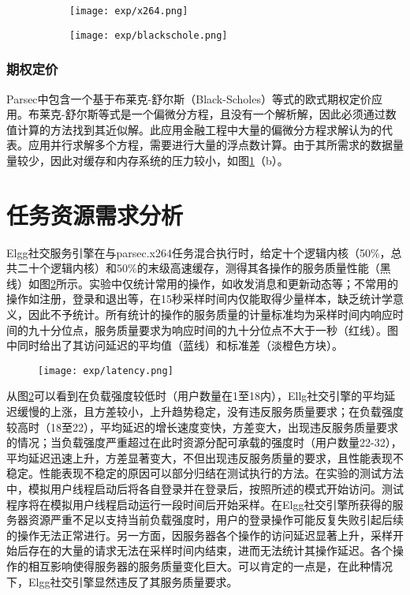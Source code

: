 \begin{figure}
  \centering
  \begin{subfigure}{0.4\textwidth}
    \centering
    \texttt{[image: exp/x264.png]}
  \end{subfigure}
  \hspace{4em}
  \begin{subfigure}{0.4\textwidth}
    \centering
    \texttt{[image: exp/blackschole.png]}
  \end{subfigure}
  \label{fig:batch_cache}
\end{figure}
\subsubsection{期权定价}
Parsec中包含一个基于布莱克-舒尔斯（Black-Scholes）等式的欧式期权定价应用。布莱克-舒尔斯等式是一个偏微分方程，且没有一个解析解，因此必须通过数值计算的方法找到其近似解。此应用金融工程中大量的偏微分方程求解认为的代表。应用并行求解多个方程，需要进行大量的浮点数计算。由于其所需求的数据量量较少，因此对缓存和内存系统的压力较小，如图\ref{fig:batch_cache}（b）。

\section{任务资源需求分析}\label{sec:pref_analysic}
Elgg社交服务引擎在与parsec.x264任务混合执行时，给定十个逻辑内核（50\%，总共二十个逻辑内核）和50\%的末级高速缓存，测得其各操作的服务质量性能（黑线）如图\ref{fig:latency}所示。实验中仅统计常用的操作，如收发消息和更新动态等；不常用的操作如注册，登录和退出等，在15秒采样时间内仅能取得少量样本，缺乏统计学意义，因此不予统计。所有统计的操作的服务质量的计量标准均为采样时间内响应时间的九十分位点，服务质量要求为响应时间的九十分位点不大于一秒（红线）。图中同时给出了其访问延迟的平均值（蓝线）和标准差（淡橙色方块）。
\vspace{1em}
\begin{figure}[h!]
  \centering
    \centering
    \texttt{[image: exp/latency.png]}
    \label{fig:latency}    
\end{figure}

从图\ref{fig:latency}可以看到在负载强度较低时（用户数量在1至18内），Ellg社交引擎的平均延迟缓慢的上涨，且方差较小，上升趋势稳定，没有违反服务质量要求；在负载强度较高时（18至22），平均延迟的增长速度变快，方差变大，出现违反服务质量要求的情况；当负载强度严重超过在此时资源分配可承载的强度时（用户数量22-32），平均延迟迅速上升，方差显著变大，不但出现违反服务质量的要求，且性能表现不稳定。性能表现不稳定的原因可以部分归结在测试执行的方法。在实验的测试方法中，模拟用户线程启动后将各自登录并在登录后，按照所述的模式开始访问。测试程序将在模拟用户线程启动运行一段时间后开始采样。在Elgg社交引擎所获得的服务器资源严重不足以支持当前负载强度时，用户的登录操作可能反复失败引起后续的操作无法正常进行。另一方面，因服务器各个操作的访问延迟显著上升，采样开始后存在的大量的请求无法在采样时间内结束，进而无法统计其操作延迟。各个操作的相互影响使得服务器的服务质量变化巨大。可以肯定的一点是，在此种情况下，Elgg社交引擎显然违反了其服务质量要求。

